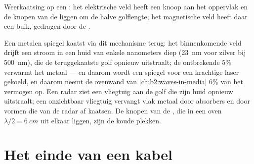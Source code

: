 \begin{omfigure}

{\small Weerkaatsing op een : het elektrische veld heeft
een knoop aan het oppervlak en de knopen van de  liggen om de
halve golflengte; het magnetische veld heeft daar een buik, gedragen door de
.}
\end{omfigure}

\begin{example}\label{ex:b2:wave-interfaces:conductoruses}
Een metalen spiegel kaatst via dit mechanisme terug: het binnenkomende veld
drijft een stroom in een huid van enkele nanometers diep (\qty{23}{nm} voor
zilver bij \qty{500}{nm}), die de teruggekaatste golf opnieuw uitstraalt; de
ontbrekende $5\%$ verwarmt het metaal --- en daarom wordt een spiegel voor
een krachtige laser gekoeld, en daarom neemt de ovenwand van
\cref{ch:b2:waves-in-media} $6\%$ van het vermogen op. Een radar ziet een
vliegtuig aan de golf die zijn huid opnieuw uitstraalt; een onzichtbaar
vliegtuig vervangt vlak metaal door absorbers en door vormen die van de
radar af kaatsen. De knopen van de , die in een oven
$\lambda/2 =
\qty{6}{cm}$ uit elkaar liggen, zijn de koude plekken.
\end{example}

\section{Het einde van een kabel}

